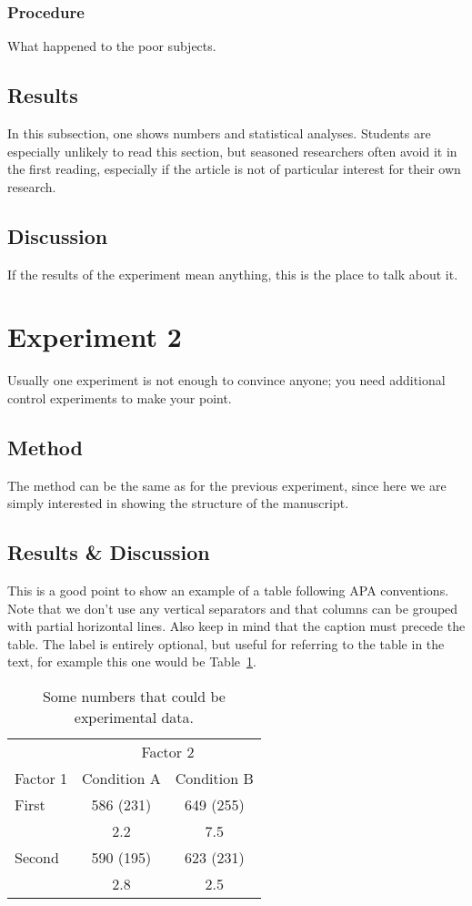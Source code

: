 \documentclass[man]{apa}
\begin{document}
\subsubsection{Procedure}
What happened to the poor subjects.
\subsection{Results}
In this subsection, one shows numbers and statistical analyses.  Students are especially unlikely to read this section, but seasoned researchers often avoid it in the first reading, especially if the article is not of particular interest for their own research.
\subsection{Discussion}
If the results of the experiment mean anything, this is the place to talk about it. 

\section{Experiment 2}
Usually one experiment is not enough to convince anyone; you need additional control experiments to make your point.
\subsection{Method}
The method can be the same as for the previous experiment, since here we are simply interested in showing the structure of the manuscript.
\subsection{Results \& Discussion}
This is a good point to show an example of a table following APA conventions. Note that we don't use any vertical separators and that columns can be grouped with partial horizontal lines.  
Also keep in mind that the caption must precede the table. The label is entirely optional, but useful for referring to the table in the text, for example this one would be Table~\ref{tab:tab1}.
\begin{table}[tbp]
\caption{Some numbers that could be experimental data.}
\label{tab:tab1}
\begin{tabular}{lcc}\hline
          & \multicolumn{2}{c}{Factor 2} \\ \cline{2-3}
Factor 1  & Condition A  & Condition B   \\ \hline
First     & 586 (231)    & 649 (255)     \\
          &    2.2       &    7.5        \\
Second    & 590 (195)    & 623 (231)     \\
          &    2.8       &    2.5        \\ \hline
\end{tabular}
\end{table}
\end{document}
